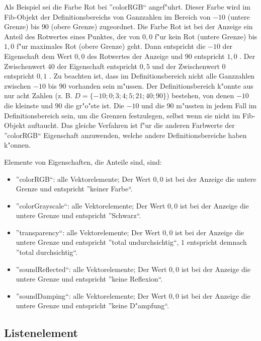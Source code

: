 Als Beispiel sei die Farbe Rot bei ''colorRGB`` angef"uhrt. Dieser Farbe wird im Fib-Objekt der Definitionsbereichs von Ganzzahlen im Bereich von $-10$ (untere Grenze) bis $90$ (obere Grenze) zugeordnet. Die Farbe Rot ist bei der Anzeige ein Anteil des Rotwertes eines Punktes, der von $0{,}0$ f"ur kein Rot (untere Grenze) bis $1{,}0$ f"ur maximales Rot (obere Grenze) geht. Dann entspricht die $-10$ der Eigenschaft dem Wert $0{,}0$ des Rotwertes der Anzeige und $90$ entspricht $1{,}0$ . Der Zwischenwert $40$ der Eigenschaft entspricht $0{,}5$ und der Zwischenwert $0$ entspricht $0{,}1$ . Zu beachten ist, dass im Definitionsbereich nicht alle Ganzzahlen zwischen $-10$ bis $90$ vorhanden sein m"ussen. Der Definitionsbereich k"onnte aus nur acht Zahlen (z. B. $D=\{-10; 0; 3; 4; 5; 21; 40;90\}$) bestehen, von denen $-10$ die kleinste und $90$ die gr"o"ste ist. Die $-10$ und die $90$ m"ussten in jedem Fall im Definitionsbereich sein, um die Grenzen festzulegen, selbst wenn sie nicht im Fib-Objekt auftaucht.
Das gleiche Verfahren ist f"ur die anderen Farbwerte der ''colorRGB`` Eigenschaft anzuwenden, welche andere Definitionsbereiche haben k"onnen.

\bigskip\noindent
Elemente von Eigenschaften, die Anteile sind, sind:
\begin{itemize}
 \item ''colorRGB``: alle Vektorelemente; Der Wert $0{,}0$ ist bei der Anzeige die untere Grenze und entspricht ''keiner Farbe``.
 \item ''colorGrayscale``: alle Vektorelemente; Der Wert $0{,}0$ ist bei der Anzeige die untere Grenze und entspricht ''Schwarz``.
 \item ''transparency``: alle Vektorelemente; Der Wert $0{,}0$ ist bei der Anzeige die untere Grenze und entspricht ''total undurchsichtig``, $1$ entspricht demnach ''total durchsichtig``.
 \item ''soundReflected``: alle Vektorelemente; Der Wert $0{,}0$ ist bei der Anzeige die untere Grenze und entspricht ''keine Reflexion``.
 \item ''soundDamping``: alle Vektorelemente; Der Wert $0{,}0$ ist bei der Anzeige die untere Grenze und entspricht ''keine D"ampfung``.
\end{itemize}



\subsection{Listenelement}
\label{fibList}

